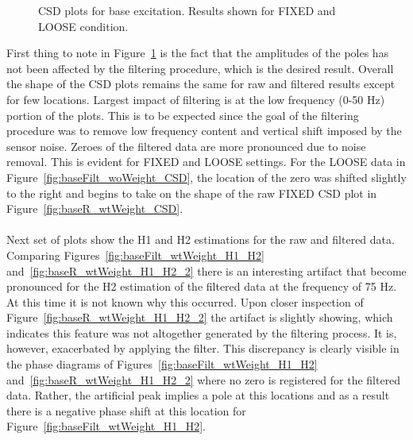 \documentclass[paper=a4, fontsize=12pt]{scrartcl} %
\begin{document}
\begin{figure}[H]
{		\label{fig:baseR_wtWeight_CSD}
		}
		\caption{CSD plots for base excitation. Results shown for FIXED and LOOSE condition.}
		\label{fig:FiltBaseCSDFigs}
	\end{figure}
%
First thing to note in Figure~\ref{fig:FiltBaseCSDFigs} is the fact that the amplitudes of the poles has not been affected by the filtering procedure, which is the desired result. Overall the shape of the CSD plots remains the same for raw and filtered results except for few locations. Largest impact of filtering is at the low frequency (0-50 Hz) portion of the plots. This is to be expected since the goal of the filtering procedure was to remove low frequency content and vertical shift imposed by the sensor noise. Zeroes of the filtered data are more pronounced due to noise removal. This is evident for FIXED and LOOSE settings. For the LOOSE data in Figure~\ref{fig:baseFilt_woWeight_CSD}, the location of the zero was shifted slightly to the right and begins to take on the shape of the raw FIXED CSD plot in Figure~\ref{fig:baseR_wtWeight_CSD}.
\\
\\
Next set of plots show the H1 and H2 estimations for the raw and filtered data. Comparing Figures~\ref{fig:baseFilt_wtWeight_H1_H2} and~\ref{fig:baseR_wtWeight_H1_H2_2} there is an interesting artifact that become pronounced for the H2 estimation of the filtered data at the frequency of 75 Hz. At this time it is not known why this occurred. Upon closer inspection of Figure~\ref{fig:baseR_wtWeight_H1_H2_2} the artifact is slightly showing, which indicates this feature was not altogether generated by the filtering process. It is, however, exacerbated by applying the filter. This discrepancy is clearly visible in the phase diagrams of Figures~\ref{fig:baseFilt_wtWeight_H1_H2} and~\ref{fig:baseR_wtWeight_H1_H2_2} where no zero is registered for the filtered data. Rather, the artificial peak implies a pole at this locations and as a result there is a negative phase shift at this location for Figure~\ref{fig:baseFilt_wtWeight_H1_H2}.
\end{document}
